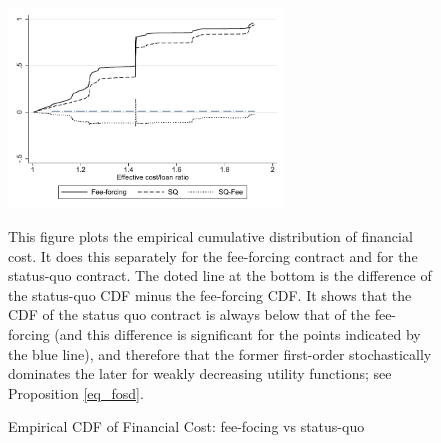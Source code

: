 \documentclass[oneside,11pt]{article}
\begin{document}
\begin{figure}[H]
        \caption{Empirical CDF of Financial Cost: fee-focing vs status-quo}
    \label{ecdf_fc}
    \begin{center}
        \centering
        \includegraphics[width=0.65\textwidth]{Figuras/cdf_eff_pro_2.pdf}
    \end{center}
    \scriptsize This figure plots the empirical cumulative distribution of financial cost. It does this separately for the fee-forcing contract and for the status-quo contract. The doted line at the bottom is the difference of the status-quo CDF minus the fee-forcing CDF. It shows that the CDF of the status quo contract is always below that of the fee-forcing (and this difference is significant for the points indicated by the blue line), and therefore that the former first-order stochastically dominates the later for weakly decreasing utility functions; see Proposition \ref{eq_fosd}.
\end{figure}
\end{document}

